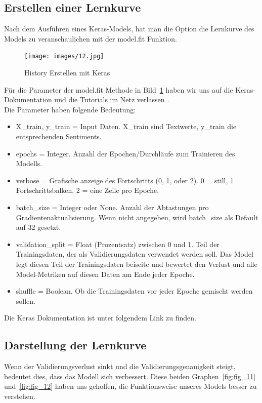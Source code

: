 \subsection{Erstellen einer Lernkurve}
Nach dem Ausführen eines Keras-Models, hat man die Option die Lernkurve des Models zu veranschaulichen mit der model.fit Funktion.
\begin{figure}[ht!]
\centering
\texttt{[image: images/12.jpg]}
\caption{History Erstellen mit Keras}
\label{fig:fig_10}
\end{figure}
\FloatBarrier

Für die Parameter der model.fit Methode in Bild~\ref{fig:fig_10} haben wir uns auf die Keras-Dokumentation und die Tutorials im Netz verlassen \cite{tutorial_keras}.\\
Die Parameter haben folgende Bedeutung:
\begin{itemize}
    \item X\_train, y\_train = Input Daten. X\_train sind Textwerte, y\_train die entsprechenden Sentiments.
    \item epochs = Integer. Anzahl der Epochen/Durchläufe zum Trainieren des Modells.
    \item verbose =  Grafische anzeige des Fortschritts (0, 1, oder 2). 0 = still, 1 = Fortschrittsbalken, 2 = eine Zeile pro Epoche.
    \item batch\_size = Integer oder None. Anzahl der Abtastungen pro Gradientenaktualisierung. Wenn nicht angegeben, wird batch\_size als Default auf 32 gesetzt.
    \item validation\_split = Float (Prozentsatz) zwischen 0 und 1. Teil der Trainingsdaten, der als Validierungsdaten verwendet werden soll. Das Model legt diesen Teil der Trainingsdaten beiseite und bewertet den Verlust und alle Model-Metriken auf diesen Daten am Ende jeder Epoche. 
    \item shuffle = Boolean. Ob die Trainingsdaten vor jeder Epoche gemischt werden sollen.
\end{itemize}
Die Keras Dokumentation ist unter folgendem Link \cite{keras} zu finden.

\subsection{Darstellung der Lernkurve}
Wenn der Validierungsverlust sinkt und die Validierungsgenauigkeit steigt, bedeutet dies, dass das Modell sich verbessert. Diese beiden Graphen~\ref{fig:fig_11} und~\ref{fig:fig_12} haben uns geholfen, die Funktionsweise unseres Models besser zu verstehen.

